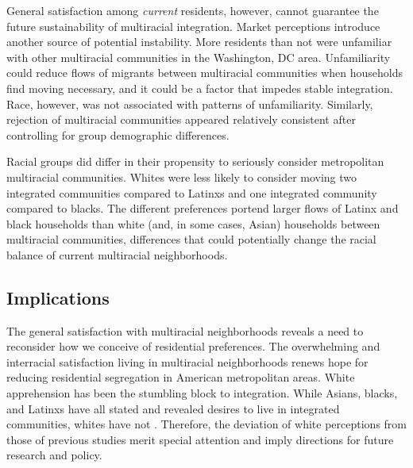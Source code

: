\documentclass{baderart}
\begin{document}

General satisfaction among \emph{current} residents, however, cannot guarantee the future sustainability of multiracial integration. Market perceptions introduce another source of potential instability. More residents than not were unfamiliar with other multiracial communities in the Washington, DC area. Unfamiliarity could reduce flows of migrants between multiracial communities when households find moving necessary, and it could be a factor that impedes stable integration. Race, however, was not associated with patterns of unfamiliarity. Similarly, rejection of multiracial communities appeared relatively consistent after controlling for group demographic differences. 

Racial groups did differ in their propensity to seriously consider metropolitan multiracial communities. Whites were less likely to consider moving two integrated communities compared to Latinxs and one integrated community compared to blacks. The different preferences portend larger flows of Latinx and black households than white (and, in some cases, Asian) households between multiracial communities, differences that could potentially change the racial balance of current multiracial neighborhoods. 

\subsection{Implications}
The general satisfaction with multiracial neighborhoods reveals a need to reconsider how we conceive of residential preferences. The overwhelming and interracial satisfaction living in multiracial neighborhoods renews hope for reducing residential segregation in American metropolitan areas. White apprehension has been the stumbling block to integration. While Asians, blacks, and Latinxs have all stated and revealed desires to live in integrated communities, whites have not \citep{charles_neighborhood_2000}. Therefore, the deviation of white perceptions from those of previous studies merit special attention and imply directions for future research and policy. 
\end{document}
